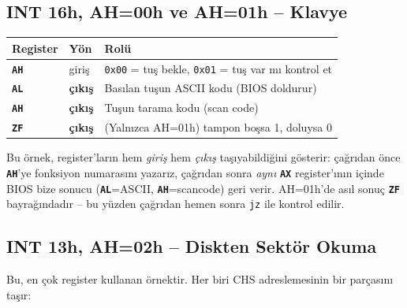 \documentclass[11pt,a4paper]{article}
\newcommand{\reg}[1]{\texttt{\color{anaMavi}\textbf{#1}}}
\newcommand{\hx}[1]{\texttt{\color{turuncu}#1}}
\newcommand{\kod}[1]{\texttt{\color{koyuGri}#1}}
\begin{document}
\subsection{INT 16h, AH=00h ve AH=01h -- Klavye}

\begin{center}
\begin{tabularx}{\textwidth}{@{}l l >{\raggedright\arraybackslash}X@{}}
\toprule
\rowcolor{anaMavi}\color{white}\textbf{Register} & \color{white}\textbf{Yön} & \color{white}\textbf{Rolü} \\
\midrule
\reg{AH} & giriş & \hx{0x00} = tuş bekle, \hx{0x01} = tuş var mı kontrol et \\
\rowcolor{acikGri} \reg{AL} & \textbf{çıkış} & Basılan tuşun ASCII kodu (BIOS doldurur) \\
\reg{AH} & \textbf{çıkış} & Tuşun tarama kodu (scan code) \\
\rowcolor{acikGri} \reg{ZF} & \textbf{çıkış} & (Yalnızca AH=01h) tampon boşsa 1, doluysa 0 \\
\bottomrule
\end{tabularx}
\end{center}

\begin{notkutu}
Bu örnek, register'ların hem \emph{giriş} hem \emph{çıkış} taşıyabildiğini
gösterir: çağrıdan önce \reg{AH}'ye fonksiyon numarasını yazarız, çağrıdan
sonra \emph{aynı} \reg{AX} register'ının içinde BIOS bize sonucu (\reg{AL}=ASCII,
\reg{AH}=scancode) geri verir. AH=01h'de asıl sonuç \reg{ZF} bayrağındadır --
bu yüzden çağrıdan hemen sonra \kod{jz} ile kontrol edilir.
\end{notkutu}

\subsection{INT 13h, AH=02h -- Diskten Sektör Okuma}

Bu, en çok register kullanan örnektir. Her biri CHS adreslemesinin bir
parçasını taşır:
\end{document}
